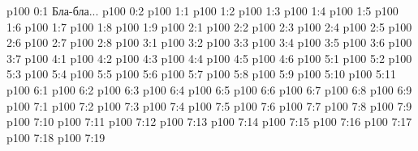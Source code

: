 \author{Мелхиседек}
\vs p100 0:1  Бла-бла...
\vs p100 0:2 
\vs p100 1:1 
\vs p100 1:2 
\vs p100 1:3 
\vs p100 1:4 
\vs p100 1:5 \pc 
\vs p100 1:6 \pc 
\vs p100 1:7 
\vs p100 1:8 
\vs p100 1:9 
\vs p100 2:1 
\vs p100 2:2 
\vs p100 2:3 
\vs p100 2:4 \pc 
\vs p100 2:5 
\vs p100 2:6 \pc 
\vs p100 2:7 
\vs p100 2:8 
\vs p100 3:1 
\vs p100 3:2 
\vs p100 3:3 
\vs p100 3:4 \pc 
\vs p100 3:5 \pc 
\vs p100 3:6 
\vs p100 3:7 
\vs p100 4:1 
\vs p100 4:2 
\vs p100 4:3 
\vs p100 4:4 \pc 
\vs p100 4:5 
\vs p100 4:6 
\vs p100 5:1 
\vs p100 5:2 
\vs p100 5:3 \pc 
\vs p100 5:4 
\vs p100 5:5 
\vs p100 5:6 \pc 
\vs p100 5:7 \pc 
\vs p100 5:8 
\vs p100 5:9 
\vs p100 5:10 
\vs p100 5:11 
\vs p100 6:1 
\vs p100 6:2 
\vs p100 6:3 
\vs p100 6:4 
\vs p100 6:5 
\vs p100 6:6 \pc 
\vs p100 6:7 
\vs p100 6:8 \pc 
\vs p100 6:9 
\vs p100 7:1 
\vs p100 7:2 
\vs p100 7:3 
\vs p100 7:4 
\vs p100 7:5 
\vs p100 7:6 
\vs p100 7:7 
\vs p100 7:8 
\vs p100 7:9 
\vs p100 7:10 
\vs p100 7:11 
\vs p100 7:12 
\vs p100 7:13 
\vs p100 7:14 
\vs p100 7:15 
\vs p100 7:16 
\vs p100 7:17 
\vs p100 7:18 
\vsetoff
\vs p100 7:19 
\quizlink
